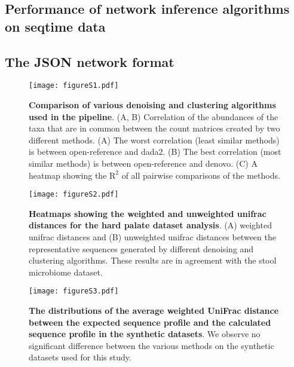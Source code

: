   \subsection*{Performance of network inference algorithms on seqtime data}
  \subsection*{The JSON network format}

  \begin{figure}[h]
  \centering
  \texttt{[image: figureS1.pdf]}
  \caption{
    \textbf{Comparison of various denoising and clustering algorithms used in the pipeline}.
    (A, B) Correlation of the abundances of the taxa that are in common between the count matrices created by two different methods.
    (A) The worst correlation (least similar methods) is between open-reference and dada2.
    (B) The best correlation (most similar methods) is between open-reference and denovo.
    (C) A heatmap showing the $\mathrm{R}^2$ of all pairwise comparisons of the methods.
  }
  \label{fig:figureS1}
\end{figure}

  \begin{figure}[h]
    \centering
    \texttt{[image: figureS2.pdf]}
    \caption{
      \textbf{Heatmaps showing the weighted and unweighted unifrac distances for the hard palate dataset analysis}.
      (A) weighted unifrac distances and (B) unweighted unifrac distances between the representative sequences generated by different denoising and clustering algorithms.
      These results are in agreement with the stool microbiome dataset.
    }
    \label{fig:figureS2}
  \end{figure}

  \begin{figure}[h]
    \centering
    \texttt{[image: figureS3.pdf]}
    \caption{
      \textbf{The distributions of the average weighted UniFrac distance between the expected sequence profile and the calculated sequence profile in the synthetic datasets}.
      We observe no significant difference between the various methods on the synthetic datasets used for this study.
    }
    \label{fig:figureS3}
  \end{figure}


